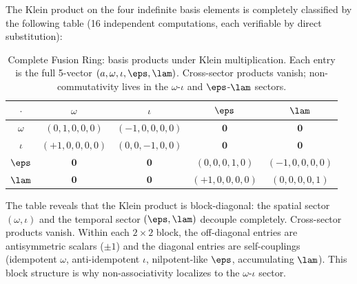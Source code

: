 The Klein product on the four indefinite basis elements is completely classified by the following table (16 independent computations, each verifiable by direct substitution):

\begin{table}[!ht]
\centering\small
\caption{Complete Fusion Ring: basis products under Klein multiplication. Each entry is the full 5-vector $(a, \omega, \iota, \eps, \lam)$. Cross-sector products vanish; non-commutativity lives in the $\omega$-$\iota$ and $\eps$-$\lam$ sectors.}
\label{tab:fusion}
\begin{tabular}{@{}c|cccc@{}}
\toprule
$\cdot$ & $\omega$ & $\iota$ & $\eps$ & $\lam$ \\
\midrule
$\omega$ & $(0,1,0,0,0)$ & $(-1,0,0,0,0)$ & $\mathbf{0}$ & $\mathbf{0}$ \\
$\iota$ & $(+1,0,0,0,0)$ & $(0,0,-1,0,0)$ & $\mathbf{0}$ & $\mathbf{0}$ \\
$\eps$ & $\mathbf{0}$ & $\mathbf{0}$ & $(0,0,0,1,0)$ & $(-1,0,0,0,0)$ \\
$\lam$ & $\mathbf{0}$ & $\mathbf{0}$ & $(+1,0,0,0,0)$ & $(0,0,0,0,1)$ \\
\bottomrule
\end{tabular}
\end{table}

\begin{remark}
The table reveals that the Klein product is block-diagonal: the spatial sector $(\omega, \iota)$ and the temporal sector $(\eps, \lam)$ decouple completely. Cross-sector products vanish. Within each $2 \times 2$ block, the off-diagonal entries are antisymmetric scalars ($\pm 1$) and the diagonal entries are self-couplings (idempotent $\omega$, anti-idempotent $\iota$, nilpotent-like $\eps$, accumulating $\lam$). This block structure is why non-associativity localizes to the $\omega$-$\iota$ sector.
\end{remark}


